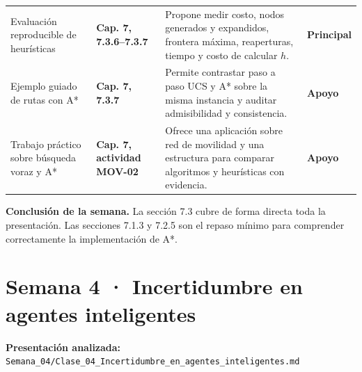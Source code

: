 \documentclass[10pt,a4paper]{article}
\newcommand{\capitulo}[1]{\textbf{\color{UAPTeal}#1}}
\newcommand{\principal}{\textbf{Principal}}
\newcommand{\apoyo}{\textbf{Apoyo}}
\begin{document}
\begin{longtable}{P{3.35cm}P{4.05cm}P{6.25cm}P{2.15cm}}
Evaluación reproducible de heurísticas & \capitulo{Cap. 7, 7.3.6--7.3.7} & Propone medir costo, nodos generados y expandidos, frontera máxima, reaperturas, tiempo y costo de calcular $h$. & \principal \\
Ejemplo guiado de rutas con A* & \capitulo{Cap. 7, 7.3.7} & Permite contrastar paso a paso UCS y A* sobre la misma instancia y auditar admisibilidad y consistencia. & \apoyo \\
Trabajo práctico sobre búsqueda voraz y A* & \capitulo{Cap. 7, actividad MOV-02} & Ofrece una aplicación sobre red de movilidad y una estructura para comparar algoritmos y heurísticas con evidencia. & \apoyo \\
\bottomrule
\end{longtable}

\textbf{Conclusión de la semana.} La sección 7.3 cubre de forma directa toda la presentación. Las secciones 7.1.3 y 7.2.5 son el repaso mínimo para comprender correctamente la implementación de A*.

\section*{Semana 4 · Incertidumbre en agentes inteligentes}

\textbf{Presentación analizada:} \texttt{Semana\_04/Clase\_04\_Incertidumbre\_en\_agentes\_inteligentes.md}
\end{document}
